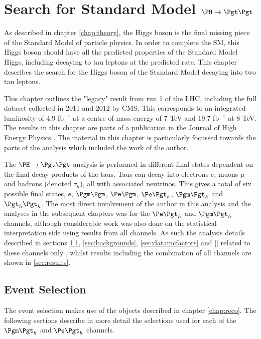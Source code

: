 \chapter{Search for Standard Model $\PH \to \Pgt\Pgt$}
\label{chap:httSM}

As described in chapter \ref{chap:theory}, the Higgs boson is the final missing 
piece of the Standard Model of particle physics. In order to complete the
\ac{SM}, this Higgs boson should have all the predicted properties of the Standard Model
Higgs, including decaying to tau leptons at the predicted rate. This
chapter describes the search for the Higgs boson of the Standard Model 
decaying into two tau leptons.

This chapter outlines the "legacy" result from run 1 of the LHC, including the
full dataset collected in 2011 and 2012 by CMS. This corresponds to an
integrated luminosity of 4.9 fb$^{-1}$ at a centre of mass energy of 7 TeV and
19.7 fb$^{-1}$ at 8 TeV. The results in this chapter are parts of a publication 
in the Journal of High Energy Physics \cite{}. The material in this chapter is
particularly focussed towards the parts of the analysis which included the work
of the author. 

The $\PH \to \Pgt\Pgt$ analysis is performed in different final states dependent
on the final decay products of the taus. Taus can decay into electrons $e$,
muons $\mu$ and hadrons (denoted $\tau_{h}$), all with associated neutrinos.
This gives a total of six possible final states, $\ee$, $\mumu$, $\emu$,
$\etau$, $\mutau$ and $\tautau$. The most direct involvement of the author in this
analysis and the analyses in the subsequent chapters was for the $\etau$ and
$\mutau$ channels, although considerable work was also done on the statistical
interpretation side using results from all channels. 
As such the analysis details described in sections \ref{sec:eventSelection},
\ref{sec:backgrounds}, \ref{sec:datamcfactors} and \ref{} related to these
channels only , whilst results including the combination of all
channels are shown in \ref{sec:results}. 

\section{Event Selection}
\label{sec:eventSelection}

The event selection makes use of the objects described in chapter
\ref{chap:reco}. The following sections describe in more detail the selections
used for each of the $\mutau$ and $\etau$ channels.

